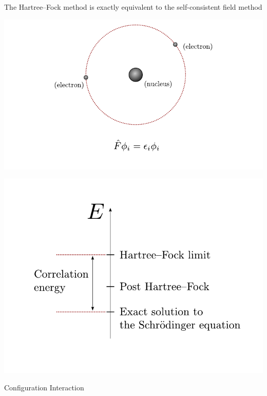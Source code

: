 \documentclass[12pt]{beamer}
\begin{document}
\begin{frame}[fragile]
{\large \color{DarkFern} The Hartree--Fock method is exactly equivalent to the self-consistent field method}
\begin{center}
\includegraphics[width=\textwidth]{pres4}
\end{center}
\end{frame}

\begin{frame}[fragile]
\begin{center}
\includegraphics[width=\textwidth]{pres1}
\end{center}
\end{frame}

\begin{frame}[fragile]
\begin{center}
{\Huge \color{DarkFern} Configuration Interaction}
\end{center}
\end{frame}
\end{document}
